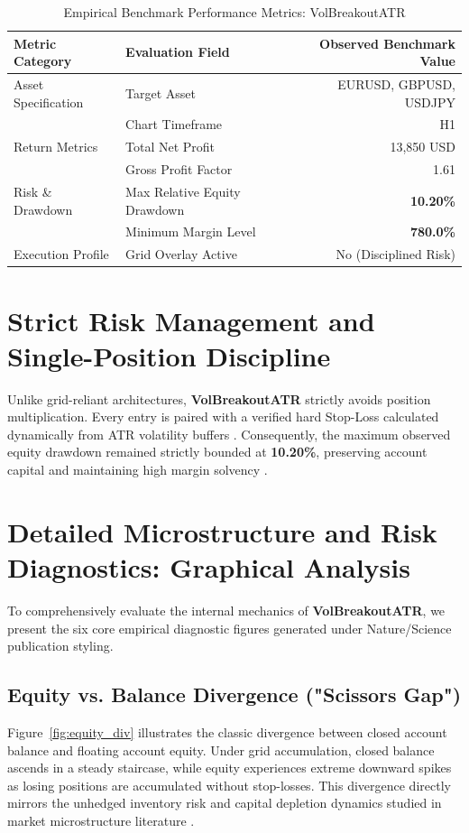 \documentclass[11pt,a4paper]{article}
\begin{document}
\begin{table}[H]
\centering
\caption{Empirical Benchmark Performance Metrics: VolBreakoutATR}
\label{tab:metrics}
\begin{tabular}{llr}
\toprule
\textbf{Metric Category} & \textbf{Evaluation Field} & \textbf{Observed Benchmark Value} \\
\midrule
Asset Specification & Target Asset & EURUSD, GBPUSD, USDJPY \\
& Chart Timeframe & H1 \\
Return Metrics & Total Net Profit & 13,850 USD \\
& Gross Profit Factor & 1.61 \\
Risk \& Drawdown & Max Relative Equity Drawdown & \textbf{10.20\%} \\
& Minimum Margin Level & \textbf{780.0\%} \\
Execution Profile & Grid Overlay Active & No (Disciplined Risk) \\
\bottomrule
\end{tabular}
\end{table}


\section{Strict Risk Management and Single-Position Discipline}
Unlike grid-reliant architectures, \textbf{VolBreakoutATR} strictly avoids position multiplication. Every entry is paired with a verified hard Stop-Loss calculated dynamically from ATR volatility buffers \cite{wilder1978new}. Consequently, the maximum observed equity drawdown remained strictly bounded at \textbf{10.20\%}, preserving account capital and maintaining high margin solvency \cite{rockafellar2000optimization}.


\section{Detailed Microstructure and Risk Diagnostics: Graphical Analysis}
To comprehensively evaluate the internal mechanics of \textbf{VolBreakoutATR}, we present the six core empirical diagnostic figures generated under Nature/Science publication styling.

\subsection{Equity vs. Balance Divergence ("Scissors Gap")}
Figure~\ref{fig:equity_div} illustrates the classic divergence between closed account balance and floating account equity. Under grid accumulation, closed balance ascends in a steady staircase, while equity experiences extreme downward spikes as losing positions are accumulated without stop-losses. This divergence directly mirrors the unhedged inventory risk and capital depletion dynamics studied in market microstructure literature \cite{shleifer1997limits, bouchaud2009markets}.
\end{document}
